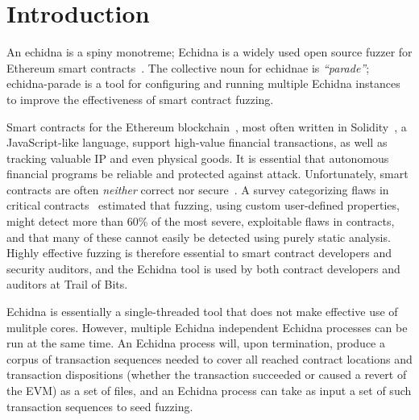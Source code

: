 \documentclass[sigconf]{acmart}
\begin{document}



\maketitle

\section{Introduction}

An echidna is a spiny monotreme; Echidna is a widely used open source fuzzer for
Ethereum smart contracts~\cite{echidnaissta,echidna-code}.  The collective noun for
echidnae is \emph{``parade''}; echidna-parade is a tool for configuring and
running multiple Echidna instances to improve the
effectiveness of smart contract fuzzing.

Smart contracts for the Ethereum blockchain~\cite{buterin2013whitepaper}, most often written in Solidity~\cite{wood2014yellow}, a
JavaScript-like language, support high-value financial transactions,
as well as tracking valuable IP and even physical goods.  It is essential that
autonomous financial programs be reliable and protected against
attack.  Unfortunately, smart contracts are often \emph{neither}
correct nor secure~\cite{SurveyAttacks}.  A survey categorizing flaws
in critical contracts~\cite{FC20} estimated that fuzzing, using custom
user-defined properties, might detect more than 60\% of the most
severe, exploitable flaws in contracts, and that many of these cannot easily
be detected using purely static analysis.  Highly effective fuzzing is
therefore essential to smart contract developers and security
auditors, and the Echidna tool is used by both contract developers
and auditors at Trail of Bits.

Echidna is essentially a single-threaded tool that does not make
effective use of mulitple cores.  However, multiple Echidna
independent Echidna processes can be run at the same time.  An Echidna
process will, upon termination, produce a corpus of transaction
sequences needed to cover all reached contract locations and
transaction dispositions (whether the transaction succeeded or caused
a revert of the EVM) as a set of files, and an Echidna process can
take as input a set of such transaction sequences to seed fuzzing.
\end{document}
